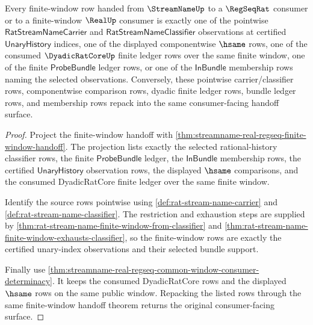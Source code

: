 \begin{theorem}
\label{thm:streamname-regseqrat-visible-row-exhaustion}
Every finite-window row handed from $\StreamNameUp$ to a $\RegSeqRat$ consumer
or to a finite-window $\RealUp$ consumer is exactly one of the pointwise
$\mathsf{RatStreamNameCarrier}$ and $\mathsf{RatStreamNameClassifier}$
observations at certified $\mathsf{UnaryHistory}$ indices, one of the displayed
componentwise $\hsame$ rows, one of the consumed $\DyadicRatCoreUp$ finite
ledger rows over the same finite window, one of the finite
$\mathsf{ProbeBundle}$ ledger rows, or one of the $\mathsf{InBundle}$ membership
rows naming the selected observations. Conversely, these pointwise
carrier/classifier rows, componentwise comparison rows, dyadic finite ledger
rows, bundle ledger rows, and membership rows repack into the same
consumer-facing handoff surface.
\end{theorem}
\begin{proof}
Project the finite-window handoff with
\autoref{thm:streamname-real-regseq-finite-window-handoff}. The projection lists
exactly the selected rational-history classifier rows, the finite
$\mathsf{ProbeBundle}$ ledger, the $\mathsf{InBundle}$ membership rows, the
certified $\mathsf{UnaryHistory}$ observation rows, the displayed $\hsame$
comparisons, and the consumed DyadicRatCore finite ledger over the same finite
window.

Identify the source rows pointwise using \autoref{def:rat-stream-name-carrier}
and \autoref{def:rat-stream-name-classifier}. The restriction and exhaustion
steps are supplied by \autoref{thm:rat-stream-name-finite-window-from-classifier}
and \autoref{thm:rat-stream-name-finite-window-exhausts-classifier}, so the
finite-window rows are exactly the certified unary-index observations and their
selected bundle support.

Finally use
\autoref{thm:streamname-real-regseq-common-window-consumer-determinacy}. It
keeps the consumed DyadicRatCore rows and the displayed $\hsame$ rows on the
same public window. Repacking the listed rows through the same finite-window
handoff theorem returns the original consumer-facing surface.
\end{proof}

